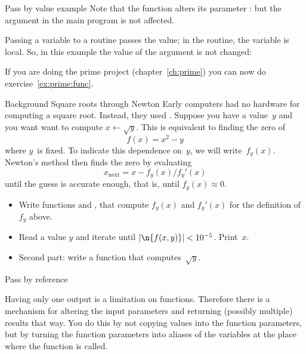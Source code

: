 \begin{slide}{Pass by value example}
  \label{sl:func-functional-ex}
  Note that the function alters its parameter :
  but the argument in the main program is not affected.
\end{slide}

Passing a variable to a routine passes the value; in the routine, the
variable is local. So, in this example
the value of the argument is not changed:


\begin{exercise}
If you are doing the prime project (chapter~\ref{ch:prime}) you can
now do exercise~\ref{ex:prime:func}.
\end{exercise}

\begin{block}{Background Square roots through Newton}
  \label{sl:newton-root}
  Early computers had no hardware for computing a square
  root. Instead, they used . Suppose you
  have a value~$y$ and you want want to compute
  $x\leftarrow\sqrt{y}$. This is equivalent to finding the zero of
  \[ f(x) = x^2-y \] where $y$~is fixed. To indicate this dependence
  on~$y$, we will write~$f_y(x)$. Newton's method then finds the zero by
  evaluating
  \[ x_{\mathrm{next}}=x-f_y(x)/f_y'(x) \]
  until the guess is accurate enough, that is, until $f_y(x)\approx0$.
\end{block}

\begin{exercise}
  \label{ex:newton-root}
  \begin{itemize}
  \item Write functions  and , that compute
    $f_y(x)$ and $f_y'(x)$ for the definition of $f_y$ above.
  \item Read a value $y$ and iterate until $|\n{f(x,y)}|<10^{-5}$. Print~$x$.
  \item Second part: write a function  that computes~$\sqrt{y}$.
  \end{itemize}
\end{exercise}

 {Pass by reference}
\label{sec:pass-by-ref}
  
Having only one output is a limitation on functions. Therefore there
is a mechanism for altering the input parameters and returning
(possibly multiple) results that way. You do this by not copying
values into the function parameters, but by turning the function
parameters into aliases of the variables at the place where the
function is called.

